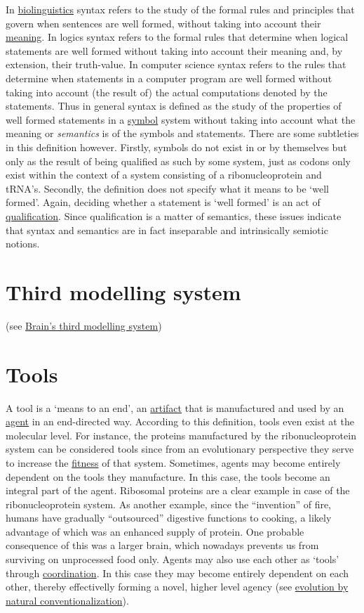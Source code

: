\documentclass[12pt]{article}
\begin{document}
In \hyperlink{biolinguistics}{biolinguistics} syntax refers to the
study of the formal rules and principles that govern when sentences
are well formed, without taking into account their \hyperlink{meaning}{meaning}. In logics
syntax refers to the formal rules that determine when logical
statements are well formed without taking into account their meaning
and, by extension, their truth-value.  In computer science syntax
refers to the rules that determine when statements in a computer
program are well formed without taking into account (the result of)
the actual computations denoted by the statements. Thus in general
syntax is defined as the study of the properties of well formed
statements in a \hyperlink{icons_indexes_and_symbols}{symbol} system without taking into account what the
meaning or \textit{semantics} is of the symbols and statements.  There are some
subtleties in this definition however. Firstly, symbols do not exist
in or by themselves but only as the result of being qualified as such
by some system, just as codons only exist within the context of a
system consisting of a ribonucleoprotein and tRNA's. Secondly, the
definition does not specify what it means to be `well formed'. Again,
deciding whether a statement is `well formed' is an act of
\hyperlink{qualification}{qualification}. Since qualification is a
matter of semantics, these issues indicate that syntax and semantics
are in fact inseparable and intrinsically semiotic notions.

\hypertarget{third_modelling_system}{}
\section{Third modelling system} (see \hyperlink{brains_third_modelling_system}{Brain's third modelling system})

\hypertarget{tools}{}
\section{Tools} 
A tool is a `means to an end', an \hyperlink{artifact}{artifact} that
is manufactured and used by an \hyperlink{agent}{agent} in an
end-directed way. According to this definition, tools even exist at
the molecular level. For instance, the proteins manufactured by the
ribonucleoprotein system can be considered tools since from an
evolutionary perspective they serve to increase the
\hyperlink{fitness}{fitness} of that system. Sometimes, agents may
become entirely dependent on the tools they manufacture. In this case,
the tools become an integral part of the agent. Ribosomal proteins are
a clear example in case of the ribonucleoprotein system. As another
example, since the ``invention'' of fire, humans have gradually
``outsourced'' digestive functions to cooking, a likely advantage of
which was an enhanced supply of protein. One probable consequence of
this was a larger brain, which nowadays prevents us from surviving on
unprocessed food only. Agents may also use each other as `tools'
through \hyperlink{coordination}{coordination}. In this case they may
become entirely dependent on each other, thereby effectivelly forming
a novel, higher level agency (see
\hyperlink{natural_conventionalization}{evolution by natural
  conventionalization}).
\end{document}
